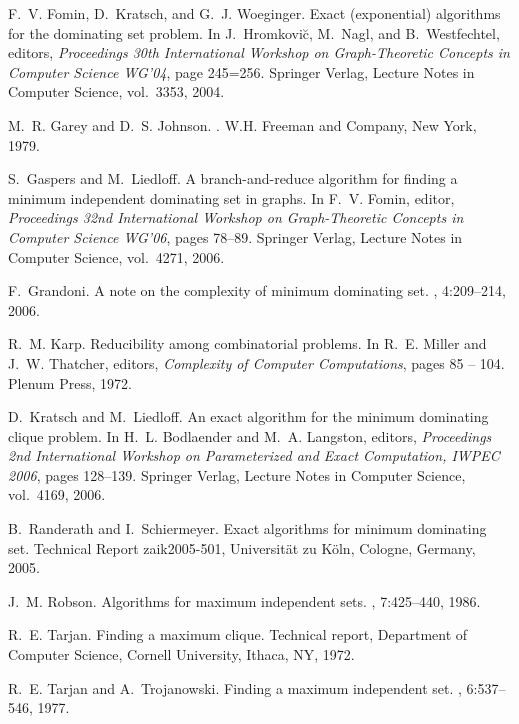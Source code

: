 \documentclass[fleqn]{stacs_proc}
\begin{document}
\begin{thebibliography}{10}
F.~V. Fomin, D.~Kratsch, and G.~J. Woeginger.
\newblock Exact (exponential) algorithms for the dominating set problem.
\newblock In J.~Hromkovi\u{c}, M.~Nagl, and B.~Westfechtel, editors, {\em
  Proceedings 30th International Workshop on Graph-Theoretic Concepts in
  Computer Science WG'04}, page 245=256. Springer Verlag, Lecture Notes in
  Computer Science, vol.\ 3353, 2004.

M.~R. Garey and D.~S. Johnson.
.
\newblock W.H. Freeman and Company, New York, 1979.

S.~Gaspers and M.~Liedloff.
\newblock A branch-and-reduce algorithm for finding a minimum independent
  dominating set in graphs.
\newblock In F.~V. Fomin, editor, {\em Proceedings 32nd International Workshop
  on Graph-Theoretic Concepts in Computer Science WG'06}, pages 78--89.
  Springer Verlag, Lecture Notes in Computer Science, vol.\ 4271, 2006.

F.~Grandoni.
\newblock A note on the complexity of minimum dominating set.
, 4:209--214, 2006.

R.~M. Karp.
\newblock Reducibility among combinatorial problems.
\newblock In R.~E. Miller and J.~W. Thatcher, editors, {\em Complexity of
  Computer Computations}, pages 85 -- 104. Plenum Press, 1972.

D.~Kratsch and M.~Liedloff.
\newblock An exact algorithm for the minimum dominating clique problem.
\newblock In H.~L. Bodlaender and M.~A. Langston, editors, {\em Proceedings 2nd
  International Workshop on Parameterized and Exact Computation, IWPEC 2006},
  pages 128--139. Springer Verlag, Lecture Notes in Computer Science, vol.\
  4169, 2006.

B.~Randerath and I.~Schiermeyer.
\newblock Exact algorithms for minimum dominating set.
\newblock Technical Report zaik2005-501, Universit\"{a}t zu K\"{o}ln, Cologne,
  Germany, 2005.

J.~M. Robson.
\newblock Algorithms for maximum independent sets.
, 7:425--440, 1986.

R.~E. Tarjan.
\newblock Finding a maximum clique.
\newblock Technical report, Department of Computer Science, Cornell University,
  Ithaca, NY, 1972.

R.~E. Tarjan and A.~Trojanowski.
\newblock Finding a maximum independent set.
, 6:537--546, 1977.


\end{thebibliography}
\end{document}
